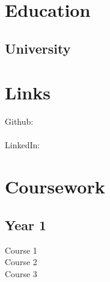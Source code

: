 \documentclass[]{deedy-resume-openfont}
\begin{document}
%
%



%
%

\begin{minipage}[t]{0.33\textwidth}


\section{Education}

\subsection{University} %
\sectionsep


\section{Links}
Github:\\ \href{https://github.com/abc}{} \\
LinkedIn: \href{https://www.linkedin.com/abc}{} \\
\sectionsep


\section{Coursework}
\subsection{Year 1}
Course 1 \\
Course 2 \\
Course 3
\sectionsep


\end{minipage}
\end{document}
